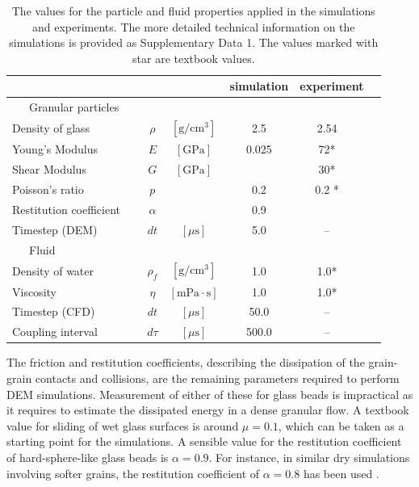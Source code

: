 \documentclass[twoside,twocolumn,9pt]{article}
\begin{document}
\begin{table}[!b]
\caption{The values for the particle and fluid properties applied in the simulations and experiments. The more detailed technical information on the simulations is provided as  Supplementary Data 1. The values marked with star are textbook values.}\label{tab:properties}
\setlength{\extrarowheight}{2pt}
  \begin{tabular*}{0.5\textwidth}{@{\extracolsep{\fill}}lccccc}
 
 \hline
 & & &	simulation		& experiment \\
    \hline
~~~Granular particles~~~	&\\[2pt]
\hline
Density of glass 				& $\rho$			& $\mathrm{[g/cm^3]}$		& 2.5 					& 2.54	~\\
Young's Modulus 			& $E$				& $\mathrm{[GPa]}$			&	0.025				& 72*	~\\
Shear Modulus 				& $G$ 				& $\mathrm{[GPa]}$			& \textendash	& 30*	~\\
Poisson's ratio					& $p$				&														& 0.2						& 0.2	*	~\\ 
Restitution coefficient	& $\alpha$		&														& 0.9   					& \textendash ~\\
Timestep (DEM) 			& $dt$				& $[\mu\mathrm{s}]$			&	5.0				& --	~\\
\hline
~~~Fluid~~~	&\\[2pt]
\hline
Density of water				& $\rho_f$		& $\mathrm{[g/cm^3]}$			& 1.0 				& 1.0* ~\\
Viscosity								& $\eta$			& $\mathrm{[mPa\cdot s]}$	& 1.0					& 1.0* ~\\
Timestep (CFD)								& $dt$			& $[\mu\mathrm{s}]$	& 50.0					& -- ~\\
Coupling interval								& $d\tau$			& $[\mu\mathrm{s}]$	& 500.0					& -- ~\\
\hline
\end{tabular*}

\end{table}

The friction and restitution coefficients, describing the dissipation of the grain-grain contacts and collisions, are the 
remaining parameters required to perform DEM simulations. Measurement of either of these for glass beads is impractical as it requires to estimate the dissipated energy in a dense granular flow. A textbook value for sliding of wet glass surfaces is around $\mu=0.1$, which can be taken as a starting point for the simulations. 
A sensible value for the restitution coefficient of hard-sphere-like glass beads is $\alpha=0.9$. For instance, in similar dry simulations involving softer grains, the restitution coefficient of $\alpha=0.8$ has been used \cite{SchwartzGM12}. 
\end{document}
